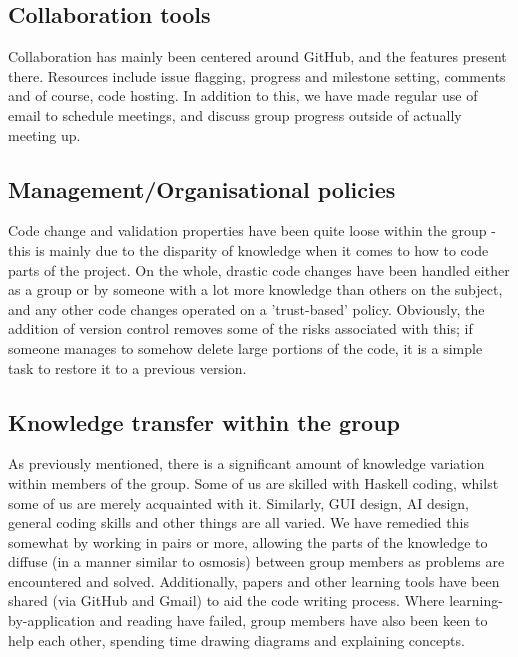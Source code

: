 \documentclass[11pt]{article}
\begin{document}
\subsection{Collaboration tools}
Collaboration has mainly been centered around GitHub, and the features present
there. Resources include issue flagging, progress and milestone setting, comments 
and of course, code hosting. In addition to this, we have made regular use of 
email to schedule meetings, and discuss group progress outside of actually 
meeting up.

\subsection{Management/Organisational policies}
Code change and validation properties have been quite loose within the group - 
this is mainly due to the disparity of knowledge when it comes to how to code 
parts of the project. On the whole, drastic code changes have been handled 
either as a group or by someone with a lot more knowledge than others on the 
subject, and any other code changes operated on a 'trust-based' policy. 
Obviously, the addition of version control removes some of the risks associated
with this; if someone manages to somehow delete large portions of the code, it
is a simple task to restore it to a previous version.

\subsection{Knowledge transfer within the group}
As previously mentioned, there is a significant amount of knowledge variation
within members of the group. Some of us are skilled with Haskell coding, whilst
some of us are merely acquainted with it. Similarly, GUI design, AI design,
general coding skills and other things are all varied. We have remedied this 
somewhat by working in pairs or more, allowing the parts of the knowledge to 
diffuse (in a manner similar to osmosis) between group members as problems are
encountered and solved. Additionally, papers and other learning tools have been
shared (via GitHub and Gmail) to aid the code writing process. Where 
learning-by-application and reading have failed, group members have also been
keen to help each other, spending time drawing diagrams and explaining concepts.
\end{document}
